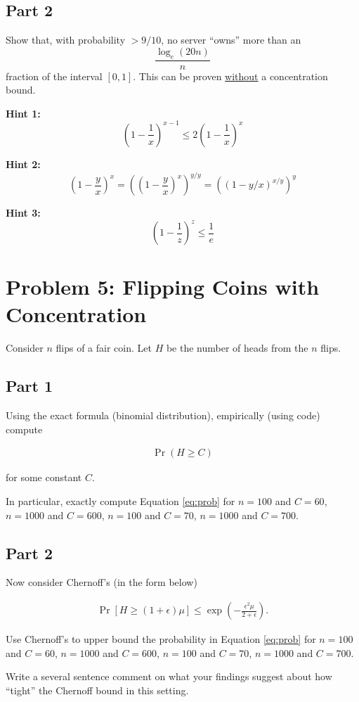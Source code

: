 \documentclass{article}
\begin{document}
\subsection*{Part 2}
Show that, with probability $>9/10$, no server ``owns'' more than an $$\frac{\log_e (20 n)}{n}$$ fraction of the interval $[0,1]$. 
This can be proven \underline{without} a concentration bound.

\textbf{Hint 1:} $$\left(1-\frac1{x}\right)^{x-1} \leq 2\left(1-\frac1{x}\right)^x$$

\textbf{Hint 2:} $$\left(1-\frac{y}{x}\right)^x=\left(\left(1-\frac{y}{x}\right)^x\right)^{y/y} = \left(\left(1-y/x\right)^{x/y}\right)^y$$

\textbf{Hint 3:} $$\left(1-\frac1{z}\right)^z \leq \frac1{e}$$

%

\newpage \section*{Problem 5: Flipping Coins with Concentration}

Consider $n$ flips of a fair coin. Let $H$ be the number of heads from the $n$ flips.

\subsection*{Part 1}

Using the exact formula (binomial distribution), empirically (using code) compute 

\begin{align}\label{eq:prob}
\Pr( H \geq C)
\end{align}

for some constant $C$.

In particular, exactly compute Equation \ref{eq:prob} for $n=100$ and $C=60$, $n=1000$ and $C=600$, $n=100$ and $C=70$, $n=1000$ and $C=700$.

\subsection*{Part 2}
Now consider Chernoff's (in the form below)

\begin{align*}
	\Pr[H \geq (1+\epsilon)\mu] \leq \exp \left(-\frac{\epsilon^2\mu}{2+\epsilon}\right).
\end{align*}

Use Chernoff's to upper bound the probability in Equation \ref{eq:prob} for $n=100$ and $C=60$, $n=1000$ and $C=600$, $n=100$ and $C=70$, $n=1000$ and $C=700$.

Write a several sentence comment on what your findings suggest about how ``tight'' the Chernoff bound in this setting.

%
\end{document}

